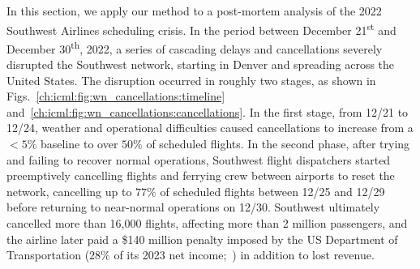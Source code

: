 In this section, we apply our method to a post-mortem analysis of the 2022 Southwest Airlines scheduling crisis. In the period between December 21\textsuperscript{st} and December 30\textsuperscript{th}, 2022, a series of cascading delays and cancellations severely disrupted the Southwest network, starting in Denver and spreading across the United States. The disruption occurred in roughly two stages, as shown in Figs.~\ref{ch:icml:fig:wn_cancellations:timeline} and~\ref{ch:icml:fig:wn_cancellations:cancellations}. In the first stage, from 12/21 to 12/24, weather and operational difficulties caused cancellations to increase from a $< 5\%$ baseline to over $50\%$ of scheduled flights. In the second phase, after trying and failing to recover normal operations, Southwest flight dispatchers started preemptively cancelling flights and ferrying crew between airports to reset the network, cancelling up to $77\%$ of scheduled flights between 12/25 and 12/29 before returning to near-normal operations on 12/30. Southwest ultimately cancelled more than 16,000 flights, affecting more than 2 million passengers, and the airline later paid a \$140 million penalty imposed by the US Department of Transportation ($28\%$ of its 2023 net income;~\cite{roseSouthwestWillPay2023}) in addition to lost revenue.

